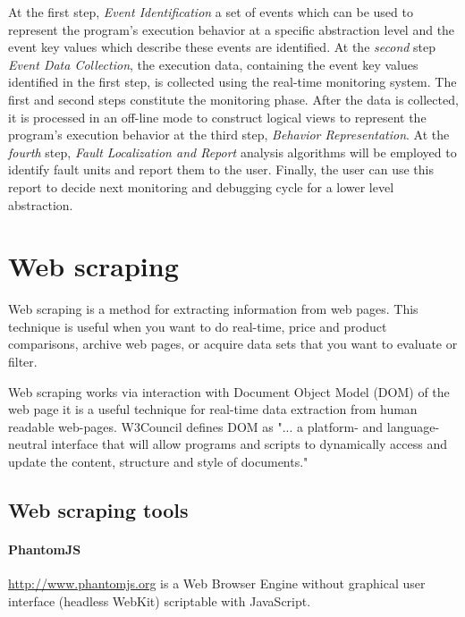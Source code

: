 At the first step, \textit{Event Identification} a set of events which can be used to represent the program's execution behavior at a specific abstraction level and the event key values which describe these events are identified. 
At the \textit{second} step \textit{Event Data Collection}, the execution data, containing the event key values identified in the first step, is collected using the real-time monitoring system. 
The first and second steps constitute the monitoring phase. 
After the data is collected, it is processed in an off-line mode to construct logical views to represent the program's execution behavior at the third step, \textit{Behavior Representation}.
At the \textit{fourth} step, \textit{Fault Localization and Report} analysis algorithms will be employed to identify fault units and report them to the user. 
Finally, the user can use this report to decide next monitoring and debugging cycle for a lower level abstraction.

\section{Web scraping}
\label{sec:scraping}
Web scraping is a method for extracting information from web pages\cite{wikiScraping}. This technique is useful when you want to do real-time, price and product comparisons, archive web pages, or acquire data sets that you want to evaluate or filter\cite{conScrap}.

Web scraping works via interaction with Document Object Model (DOM) of the web page it is a useful technique for real-time data extraction from human readable web-pages. W3Council \cite{w3cDOM} defines DOM as "... a platform- and language-neutral interface that will allow programs and scripts to dynamically access and update the content, structure and style of documents." 

\subsection{Web scraping tools}

\paragraph{PhantomJS}\cite{phantom} \url{http://www.phantomjs.org} is a Web Browser Engine without graphical user interface (headless WebKit) scriptable with JavaScript. 

